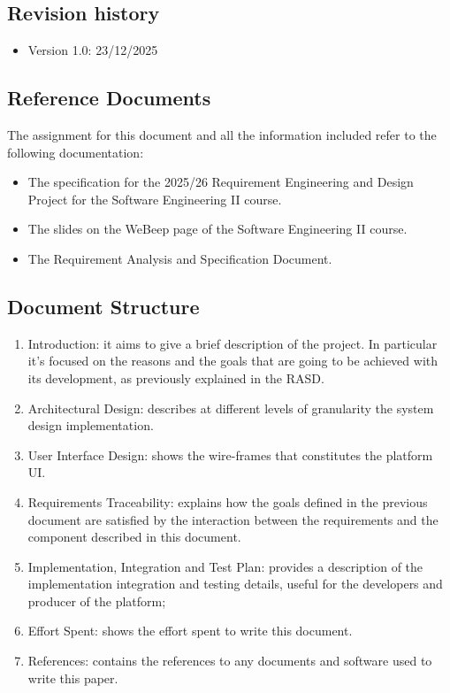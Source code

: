 \subsection{Revision history}
\begin{itemize}
    \item Version 1.0: 23/12/2025
\end{itemize}

\subsection{Reference Documents} %
The assignment for this document and all the information included refer to the following
documentation:
\begin{itemize}
    \item The specification for the 2025/26 Requirement Engineering and Design Project for the Software Engineering II course.
    \item The slides on the WeBeep page of the Software Engineering II course.
    \item The Requirement Analysis and Specification Document.
\end{itemize}

\subsection{Document Structure} %
\begin{enumerate}
    \item Introduction: it aims to give a brief description of the project. In particular it’s focused on the reasons and the goals that are going to be achieved with its development, as previously explained in the RASD.
    \item Architectural Design: describes at different levels of granularity the system design implementation.
    \item User Interface Design: shows the wire-frames that constitutes the platform UI.
    \item Requirements Traceability: explains how the goals defined in the previous document are satisfied by the interaction between the requirements and the component described in this document.
    \item Implementation, Integration and Test Plan: provides a description of the implementation integration and testing details, useful for the developers and producer of the platform;
    \item Effort Spent: shows the effort spent to write this document.
    \item References: contains the references to any documents and software used to write this paper.
\end{enumerate}
